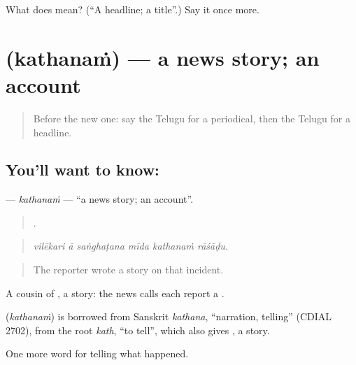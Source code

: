 \begin{tcolorbox}[breakable,colback=teal!4,colframe=teal!35!black,title={Before you move on}]
What does  mean? (\textquotedblleft{}A headline; a title\textquotedblright{}.) Say it once more.
\end{tcolorbox}
\section[\texorpdfstring{\te{కథనం} (kathanaṁ)}{కథనం (kathanaṁ)}]{ (kathanaṁ) — a news story; an account}

\label{lesson:TE-C330-kathanam}



\begin{quote}
Before the new one: say the Telugu for a periodical, then the Telugu for a headline.
\end{quote}

\subsection*{You'll want to know: }
\textbf{} — \emph{kathanaṁ} — \textquotedblleft{}a news story; an account\textquotedblright{}.

\begin{quote}
     .
\end{quote}

\begin{quote}
\emph{vilēkari ā saṅghaṭana mīda kathanaṁ rāśāḍu.}
\end{quote}

\begin{quote}
The reporter wrote a story on that incident.
\end{quote}

A cousin of , a story: the news calls each report a .

\begin{cousinweb}
\textbf{} (\emph{kathanaṁ}) is borrowed from Sanskrit \emph{kathana}, \textquotedblleft{}narration, telling\textquotedblright{} (CDIAL 2702), from the root \emph{kath}, \textquotedblleft{}to tell\textquotedblright{}, which also gives , a story.
\end{cousinweb}

\begin{grammarlens}[title={What you've built}]
One more word for telling what happened.
\end{grammarlens}


